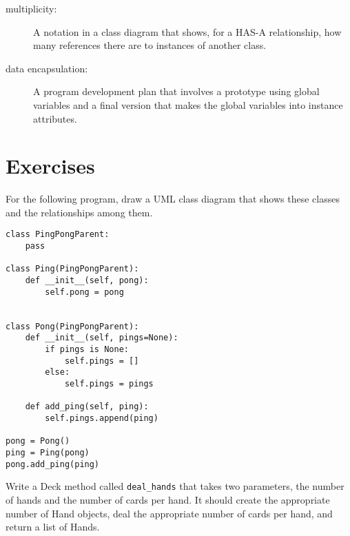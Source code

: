 \documentclass[
DIV=11,
fontsize=12,
twoside,
headinclude=false,
titlepage=firstiscover,
abstract=true,
headsepline=true,
footsepline=true,
chapterprefix=true, %
headings=big,
bibliography=totoc,%
captions=tableheading
]{scrbook}
\theoremstyle{definition}
\begin{document}
\begin{description}
\item[multiplicity:] A notation in a class diagram that shows, for
a HAS-A relationship, how many references there are to instances
of another class.

\item[data encapsulation:]  A program development plan that
involves a prototype using global variables and a final version
that makes the global variables into instance attributes. 

\end{description}


\section{Exercises}

\begin{exercise}
\normalfont
For the following program, draw a UML class diagram that shows
these classes and the relationships among them.

\begin{lstlisting}
class PingPongParent:
    pass

class Ping(PingPongParent):
    def __init__(self, pong):
        self.pong = pong


class Pong(PingPongParent):
    def __init__(self, pings=None):
        if pings is None:
            self.pings = []
        else:
            self.pings = pings

    def add_ping(self, ping):
        self.pings.append(ping)

pong = Pong()
ping = Ping(pong)
pong.add_ping(ping)
\end{lstlisting}


\end{exercise}



\begin{exercise}
\normalfont
Write a Deck method called \verb"deal_hands" that
takes two parameters, the number of hands and the number of cards per
hand.  It should create the appropriate number of Hand objects, deal
the appropriate number of cards per hand, and return a list of Hands.
\end{exercise}
\end{document}
